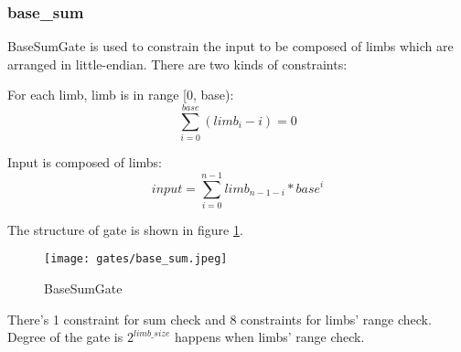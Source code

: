 \subsubsection{base\_sum}

BaseSumGate is used to constrain the input to be composed of limbs which are arranged in little-endian. There are two kinds of constraints:

For each limb, limb is in range [0, base):
\[\sum_{i=0}^{base}(limb_i - i) = 0\]

Input is composed of limbs:
\[input = \sum_{i=0}^{n-1} limb_{n-1-i} * base^i\]

The structure of gate is shown in figure \ref{fig:base-sum}.
\begin{figure}[!ht]
    \centering
    \texttt{[image: gates/base\_sum.jpeg]}
    \caption{BaseSumGate}
    \label{fig:base-sum}
\end{figure}

There's 1 constraint for sum check and 8 constraints for limbs' range check. Degree of the gate is $2^{limb\_size}$ happens when limbs' range check.